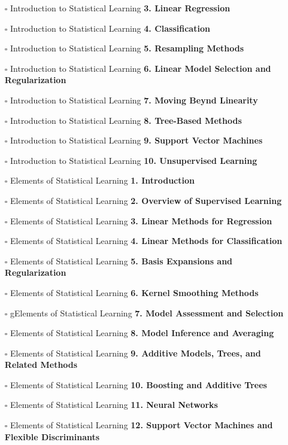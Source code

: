 \documentclass[a4, landscape, 12pt]{article}
\newcommand{\checkbox}{$\square$}%
\begin{document}
\begin{itemize}
{}
\item [\checkbox]  Introduction to Statistical Learning \textbf{ 3. Linear Regression
}
\item [\checkbox]  Introduction to Statistical Learning \textbf{ 4. Classification
}
\item [\checkbox]  Introduction to Statistical Learning \textbf{ 5. Resampling Methods
}
\item [\checkbox]  Introduction to Statistical Learning \textbf{ 6. Linear Model Selection and Regularization
}
\item [\checkbox]  Introduction to Statistical Learning \textbf{ 7. Moving Beynd Linearity
}
\item [\checkbox]  Introduction to Statistical Learning \textbf{ 8. Tree-Based Methods
}
\item [\checkbox]  Introduction to Statistical Learning \textbf{ 9. Support Vector Machines
}
\item [\checkbox]  Introduction to Statistical Learning \textbf{ 10. Unsupervised Learning
}
\item [\checkbox]  Elements of Statistical Learning \textbf{ 1. Introduction
}
\item [\checkbox]  Elements of Statistical Learning \textbf{ 2. Overview of Supervised Learning
}
\item [\checkbox]  Elements of Statistical Learning \textbf{ 3. Linear Methods for Regression
}
\item [\checkbox]  Elements of Statistical Learning \textbf{ 4. Linear Methods for Classification
}
\item [\checkbox]  Elements of Statistical Learning \textbf{ 5. Basis Expansions and Regularization
}
\item [\checkbox]  Elements of Statistical Learning \textbf{ 6. Kernel Smoothing Methods
}
\item [\checkbox]  gElements of Statistical Learning \textbf{ 7. Model Assessment and Selection
}
\item [\checkbox]  Elements of Statistical Learning \textbf{ 8. Model Inference and Averaging
}
\item [\checkbox]  Elements of Statistical Learning \textbf{ 9. Additive Models, Trees, and Related Methods
}
\item [\checkbox]  Elements of Statistical Learning \textbf{ 10. Boosting and Additive Trees
}
\item [\checkbox]  Elements of Statistical Learning \textbf{ 11. Neural Networks
}
\item [\checkbox]  Elements of Statistical Learning \textbf{ 12. Support Vector Machines and Flexible Discriminants
}
\end{itemize}
\end{document}
